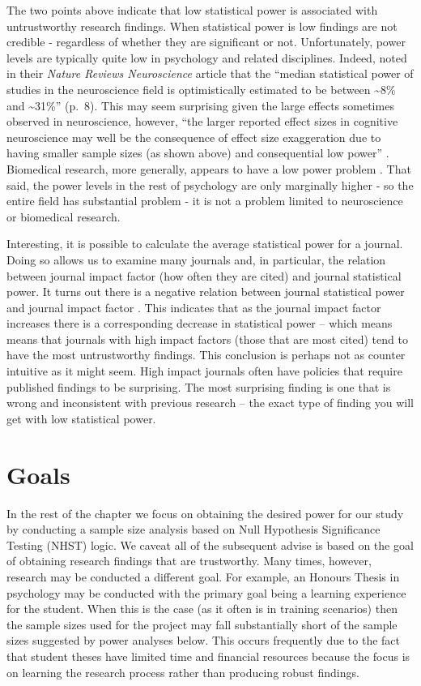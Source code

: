 \documentclass[
]{krantz}
\begin{document}
The two points above indicate that low statistical power is associated with untrustworthy research findings. When statistical power is low findings are not credible - regardless of whether they are significant or not. Unfortunately, power levels are typically quite low in psychology and related disciplines. Indeed, \citep{button2013power} noted in their \emph{Nature Reviews Neuroscience} article that the ``median statistical power of studies in the neuroscience field is optimistically estimated to be between \textasciitilde8\% and \textasciitilde31\%'' (p.~8). This may seem surprising given the large effects sometimes observed in neuroscience, however, ``the larger reported effect sizes in cognitive neuroscience may well be the consequence of effect size exaggeration due to having smaller sample sizes (as shown above) and consequential low power'' \citep[p.~8,][]{szucs2017empirical}. Biomedical research, more generally, appears to have a low power problem \citep{dumas2017low}. That said, the power levels in the rest of psychology are only marginally higher - so the entire field has substantial problem - it is not a problem limited to neuroscience or biomedical research.

Interesting, it is possible to calculate the average statistical power for a journal. Doing so allows us to examine many journals and, in particular, the relation between journal impact factor (how often they are cited) and journal statistical power. It turns out there is a negative relation between journal statistical power and journal impact factor \citep{szucs2017empirical}. This indicates that as the journal impact factor increases there is a corresponding decrease in statistical power -- which means means that journals with high impact factors (those that are most cited) tend to have the most untrustworthy findings. This conclusion is perhaps not as counter intuitive as it might seem. High impact journals often have policies that require published findings to be surprising. The most surprising finding is one that is wrong and inconsistent with previous research -- the exact type of finding you will get with low statistical power.

\hypertarget{goals}{%
\section{Goals}\label{goals}}

In the rest of the chapter we focus on obtaining the desired power for our study by conducting a sample size analysis based on Null Hypothesis Significance Testing (NHST) logic. We caveat all of the subsequent advise is based on the goal of obtaining research findings that are trustworthy. Many times, however, research may be conducted a different goal. For example, an Honours Thesis in psychology may be conducted with the primary goal being a learning experience for the student. When this is the case (as it often is in training scenarios) then the sample sizes used for the project may fall substantially short of the sample sizes suggested by power analyses below. This occurs frequently due to the fact that student theses have limited time and financial resources because the focus is on learning the research process rather than producing robust findings.
\end{document}
